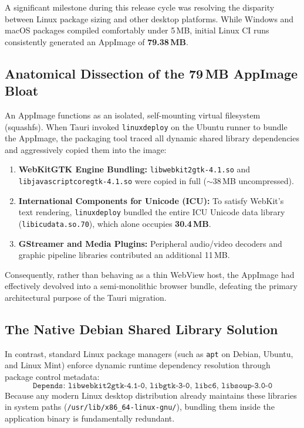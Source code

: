 \documentclass[11pt,a4paper]{article}
\begin{document}
A significant milestone during this release cycle was resolving the disparity between Linux package sizing and other desktop platforms. While Windows and macOS packages compiled comfortably under 5\,MB, initial Linux CI runs consistently generated an AppImage of \textbf{79.38\,MB}.

\subsection{Anatomical Dissection of the 79\,MB AppImage Bloat}
An AppImage functions as an isolated, self-mounting virtual filesystem (squashfs). When Tauri invoked \texttt{linuxdeploy} on the Ubuntu runner to bundle the AppImage, the packaging tool traced all dynamic shared library dependencies and aggressively copied them into the image:
\begin{enumerate}
    \item \textbf{WebKitGTK Engine Bundling:} \texttt{libwebkit2gtk-4.1.so} and \texttt{libjavascriptcoregtk-4.1.so} were copied in full ($\sim$38\,MB uncompressed).
    \item \textbf{International Components for Unicode (ICU):} To satisfy WebKit's text rendering, \texttt{linuxdeploy} bundled the entire ICU Unicode data library (\texttt{libicudata.so.70}), which alone occupies \textbf{30.4\,MB}.
    \item \textbf{GStreamer and Media Plugins:} Peripheral audio/video decoders and graphic pipeline libraries contributed an additional 11\,MB.
\end{enumerate}
Consequently, rather than behaving as a thin WebView host, the AppImage had effectively devolved into a semi-monolithic browser bundle, defeating the primary architectural purpose of the Tauri migration.

\subsection{The Native Debian Shared Library Solution}
In contrast, standard Linux package managers (such as \texttt{apt} on Debian, Ubuntu, and Linux Mint) enforce dynamic runtime dependency resolution through package control metadata:
\begin{equation}
    \texttt{Depends: libwebkit2gtk-4.1-0, libgtk-3-0, libc6, libsoup-3.0-0}
\end{equation}
Because any modern Linux desktop distribution already maintains these libraries in system paths (\texttt{/usr/lib/x86\_64-linux-gnu/}), bundling them inside the application binary is fundamentally redundant.
\end{document}
